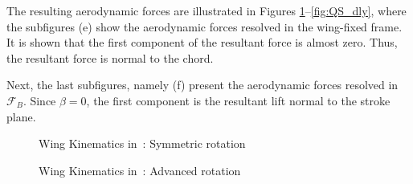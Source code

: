 \documentclass[10pt,draft]{article}
\begin{document}
The resulting aerodynamic forces are illustrated in Figures \ref{fig:QS_sym}--\ref{fig:QS_dly}, where the subfigures (e) show the aerodynamic forces resolved in the wing-fixed frame. 
It is shown that the first component of the resultant force is almost zero. 
Thus, the resultant force is normal to the chord. 

Next, the last subfigures, namely (f) present the aerodynamic forces resolved in $\mathcal{F}_B$. 
Since $\beta=0$, the first component is the resultant lift normal to the stroke plane. 


\begin{figure}[p]
    \centerline{
        \hfill
    }
    \centerline{
        \hfill
    }
    \centerline{
        \hfill
    }
    \caption{Wing Kinematics in~\cite{berman2007energy}: Symmetric rotation}\label{fig:QS_sym}
\end{figure}

\begin{figure}[p]
    \centerline{
        \hfill
    }
    \centerline{
        \hfill
    }
    \centerline{
        \hfill
    }
    \caption{Wing Kinematics in~\cite{berman2007energy}: Advanced rotation}\label{fig:QS_adv}
\end{figure}
\end{document}
